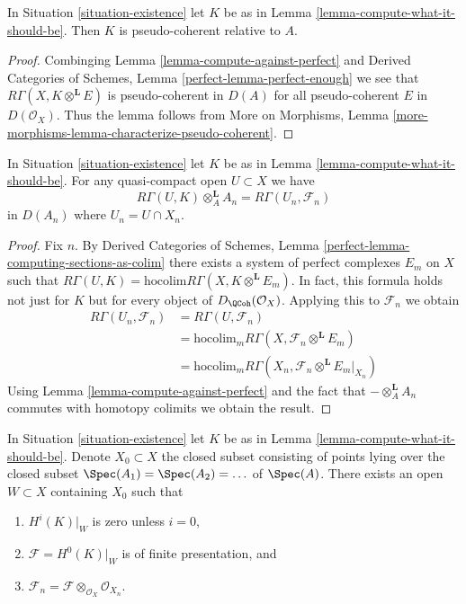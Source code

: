 \begin{lemma}
\label{lemma-relative-pseudo-coherence}
In Situation \ref{situation-existence} let $K$ be as in
Lemma \ref{lemma-compute-what-it-should-be}. Then $K$
is pseudo-coherent relative to $A$.
\end{lemma}

\begin{proof}
Combinging Lemma \ref{lemma-compute-against-perfect} and
Derived Categories of Schemes, Lemma \ref{perfect-lemma-perfect-enough}
we see that $R\Gamma(X, K \otimes^\mathbf{L} E)$
is pseudo-coherent in $D(A)$ for all pseudo-coherent
$E$ in $D(\mathcal{O}_X)$. Thus the lemma follows from
More on Morphisms, Lemma
\ref{more-morphisms-lemma-characterize-pseudo-coherent}.
\end{proof}

\begin{lemma}
\label{lemma-compute-over-affine}
In Situation \ref{situation-existence} let $K$ be as in
Lemma \ref{lemma-compute-what-it-should-be}. For any quasi-compact
open $U \subset X$ we have
$$
R\Gamma(U, K) \otimes_A^\mathbf{L} A_n =
R\Gamma(U_n, \mathcal{F}_n)
$$
in $D(A_n)$ where $U_n = U \cap X_n$.
\end{lemma}

\begin{proof}
Fix $n$. By Derived Categories of Schemes, Lemma
\ref{perfect-lemma-computing-sections-as-colim}
there exists a system of perfect complexes $E_m$
on $X$ such that
$R\Gamma(U, K) = \text{hocolim} R\Gamma(X, K \otimes^\mathbf{L} E_m)$.
In fact, this formula holds not just for $K$ but for every object of
$D_\QCoh(\mathcal{O}_X)$.
Applying this to $\mathcal{F}_n$
we obtain
\begin{align*}
R\Gamma(U_n, \mathcal{F}_n)
& =
R\Gamma(U, \mathcal{F}_n) \\
& =
\text{hocolim}_m R\Gamma(X, \mathcal{F}_n \otimes^\mathbf{L} E_m) \\
& =
\text{hocolim}_m R\Gamma(X_n, \mathcal{F}_n \otimes^\mathbf{L} E_m|_{X_n})
\end{align*}
Using Lemma \ref{lemma-compute-against-perfect}
and the fact that $- \otimes_A^\mathbf{L} A_n$
commutes with homotopy colimits we obtain the result.
\end{proof}

\begin{lemma}
\label{lemma-finitely-presented}
In Situation \ref{situation-existence} let $K$ be as in
Lemma \ref{lemma-compute-what-it-should-be}.
Denote $X_0 \subset X$ the closed subset
consisting of points lying over the closed subset
$\Spec(A_1) = \Spec(A_2) = \ldots$ of $\Spec(A)$.
There exists an open $W \subset X$ containing $X_0$
such that
\begin{enumerate}
\item $H^i(K)|_W$ is zero unless $i = 0$,
\item $\mathcal{F} = H^0(K)|_W$ is of finite presentation, and
\item $\mathcal{F}_n = \mathcal{F} \otimes_{\mathcal{O}_X} \mathcal{O}_{X_n}$.
\end{enumerate}
\end{lemma}

